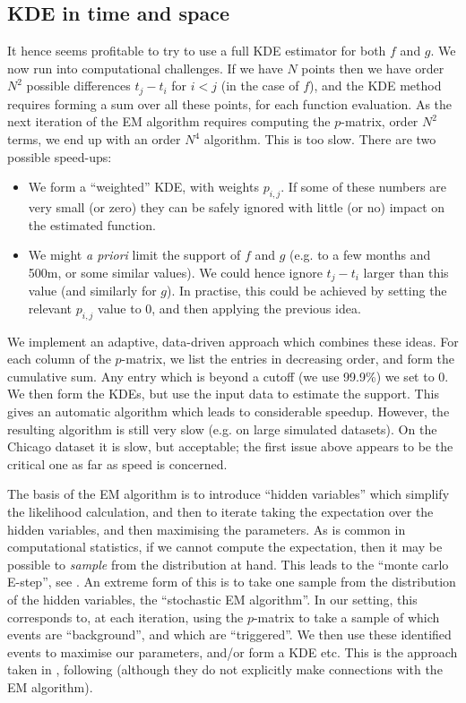 \documentclass[twoside,a4paper]{article}
\theoremstyle{plain}
\theoremstyle{definition}
\begin{document}
\subsection{KDE in time and space}\label{sec:kde_time_space}

It hence seems profitable to try to use a full KDE estimator for both $f$ and $g$.
We now run into computational challenges.  If we have $N$ points then we have order $N^2$
possible differences $t_j-t_i$ for $i<j$ (in the case of $f$),
and the KDE method requires forming a sum
over all these points, for each function evaluation.  As the next iteration of the EM algorithm
requires computing the $p$-matrix, order $N^2$ terms, we end up with an order $N^4$ algorithm.
This is too slow.  There are two possible speed-ups:
\begin{itemize}
\item We form a ``weighted'' KDE, with weights $p_{i,j}$.  If some of these numbers are
very small (or zero) they can be safely ignored with little (or no) impact on the estimated
function.
\item We might \emph{a priori} limit the support of $f$ and $g$ (e.g. to a few months and 500m,
or some similar values).  We could hence ignore $t_j - t_i$ larger than this value (and similarly
for $g$).  In practise, this could be achieved by setting the relevant $p_{i,j}$ value to $0$,
and then applying the previous idea.
\end{itemize}

We implement an adaptive, data-driven approach which combines these ideas.  For each column
of the $p$-matrix, we list the entries in decreasing order, and form the cumulative sum.  Any
entry which is beyond a cutoff (we use 99.9\%) we set to 0.  We then form the KDEs, but use the
input data to estimate the support.  This gives an automatic algorithm which leads to considerable
speedup.  However, the resulting algorithm is still very slow (e.g. on large simulated datasets).
On the Chicago dataset it is slow, but acceptable; the first issue above appears to be the
critical one as far as speed is concerned.

The basis of the EM algorithm is to introduce ``hidden variables'' which simplify the likelihood
calculation, and then to iterate taking the expectation over the hidden variables, and then
maximising the parameters.  As is common in computational statistics, if we cannot compute the
expectation, then it may be possible to \emph{sample} from the distribution at hand.  This leads
to the ``monte carlo E-step'', see \cite[Chapter~6]{mk}.  An extreme form of this is to take one
sample from the distribution of the hidden variables, the ``stochastic EM algorithm''.  In our
setting, this corresponds to, at each iteration, using the $p$-matrix to take a sample of which
events are ``background'', and which are ``triggered''.  We then use these identified events
to maximise our parameters, and/or form a KDE etc.  This is the approach taken in \cite{sepp2},
following \cite{zovj} (although they do not explicitly make connections with the EM algorithm).
\end{document}
